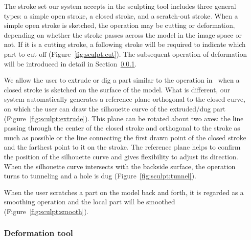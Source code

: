 The stroke set our system accepts in the sculpting tool includes
three general types: a simple open stroke, a closed stroke, and a
scratch-out stroke. When a simple open stroke is sketched, the
operation may be cutting or deformation, depending on whether the
stroke passes across the model in the image space or not. If it is a
cutting stroke, a following stroke will be required to indicate
which part to cut off (Figure~\ref{fig:sculpt:cut}). The subsequent
operation of deformation will be introduced in detail in
Section~\ref{ch3:sec:ui:sculpt:deform}.

We allow the user to extrude or dig  a part similar to the operation
in~\cite{IMT99,NISA07} when a closed stroke is sketched on the
surface of the model. What is different, our system automatically
generates a reference plane orthogonal to the closed curve, on which
the user can draw the silhouette curve of the extruded/dug part
(Figure~\ref{fig:sculpt:extrude}). This plane can be rotated about
two axes: the line passing through the center of the closed stroke
and orthogonal to the stroke as much as possible or the line
connecting the first drawn point of the closed stroke and the
farthest point to it on the stroke. The reference plane helps to
confirm the position of the silhouette curve and gives flexibility
to adjust its direction. When the silhouette curve intersects with
the backside surface, the operation turns to tunneling and a hole is
dug (Figure~\ref{fig:sculpt:tunnel}).

When the user scratches a part on the model back and  forth, it is
regarded as a smoothing operation and the local part will be
smoothed (Figure~\ref{fig:sculpt:smooth}).


\subsubsection{Deformation tool}
\label{ch3:sec:ui:sculpt:deform}


